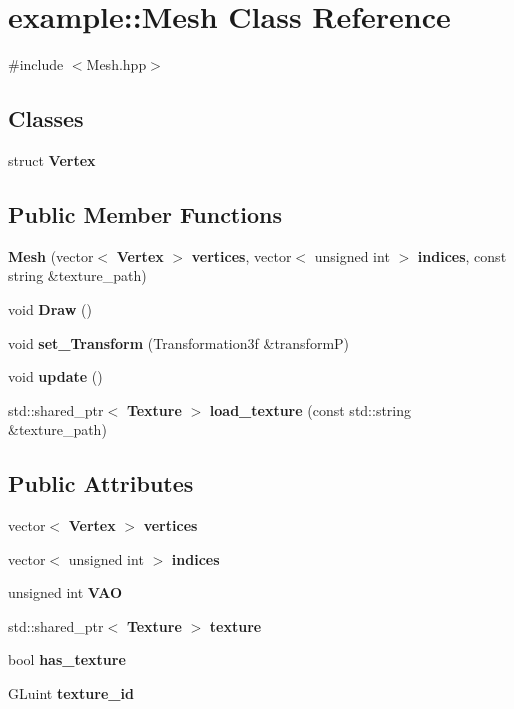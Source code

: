 \section{example\+::Mesh Class Reference}
\label{classexample_1_1_mesh}


{\ttfamily \#include $<$Mesh.\+hpp$>$}

\subsection*{Classes}
\begin{DoxyCompactItemize}
\item 
struct \textbf{ Vertex}
\end{DoxyCompactItemize}
\subsection*{Public Member Functions}
\begin{DoxyCompactItemize}
\item 
\textbf{ Mesh} (vector$<$ \textbf{ Vertex} $>$ \textbf{ vertices}, vector$<$ unsigned int $>$ \textbf{ indices}, const string \&texture\+\_\+path)
\item 
void \textbf{ Draw} ()
\item 
void \textbf{ set\+\_\+\+Transform} (Transformation3f \&transformP)
\item 
void \textbf{ update} ()
\item 
std\+::shared\+\_\+ptr$<$ \textbf{ Texture} $>$ \textbf{ load\+\_\+texture} (const std\+::string \&texture\+\_\+path)
\end{DoxyCompactItemize}
\subsection*{Public Attributes}
\begin{DoxyCompactItemize}
\item 
vector$<$ \textbf{ Vertex} $>$ \textbf{ vertices}
\item 
vector$<$ unsigned int $>$ \textbf{ indices}
\item 
unsigned int \textbf{ V\+AO}
\item 
std\+::shared\+\_\+ptr$<$ \textbf{ Texture} $>$ \textbf{ texture}
\item 
bool \textbf{ has\+\_\+texture}
\item 
G\+Luint \textbf{ texture\+\_\+id}
\end{DoxyCompactItemize}


